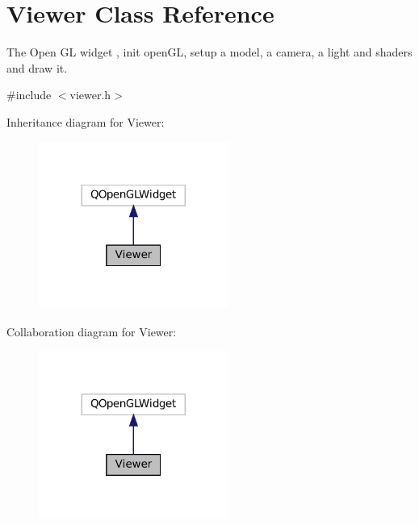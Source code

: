 \hypertarget{class_viewer}{}\section{Viewer Class Reference}
\label{class_viewer}


The Open GL widget , init open\+GL, setup a model, a camera, a light and shaders and draw it.  




{\ttfamily \#include $<$viewer.\+h$>$}



Inheritance diagram for Viewer\+:
\nopagebreak
\begin{figure}[H]
\begin{center}
\leavevmode
\includegraphics[width=176pt]{class_viewer__inherit__graph}
\end{center}
\end{figure}


Collaboration diagram for Viewer\+:
\nopagebreak
\begin{figure}[H]
\begin{center}
\leavevmode
\includegraphics[width=176pt]{class_viewer__coll__graph}
\end{center}
\end{figure}

